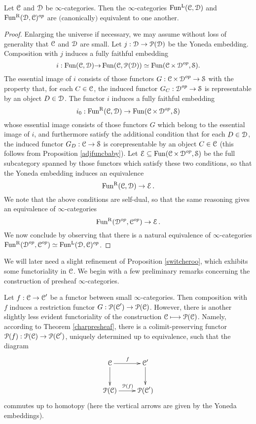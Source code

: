 \begin{proposition}\label{switcheroo}
Let $\calC$ and $\calD$ be $\infty$-categories. Then the $\infty$-categories
$\LFun(\calC, \calD)$ and $\RFun(\calD, \calC)^{op}$ are $($canonically$)$ equivalent to one another.
\end{proposition}

\begin{proof}
Enlarging the universe if necessary, we may assume without loss of generality that $\calC$ and $\calD$ are small. Let $j: \calD \rightarrow \calP(\calD)$ be the Yoneda embedding.
Composition with $j$ induces a fully faithful embedding
$$ i: \Fun(\calC,\calD) {\rightarrow} \Fun(\calC, \calP(\calD)) \simeq
\Fun( \calC \times \calD^{op}, \SSet).$$
The essential image of $i$ consists of those functors $G: \calC \times \calD^{op} \rightarrow \SSet$
with the property that, for each $C \in \calC$, the induced functor
$G_{C}: \calD^{op} \rightarrow \SSet$ is representable by an object $D \in \calD$. 
The functor $i$ induces a fully faithful embedding
$$ i_0: \RFun(\calC, \calD) \rightarrow \Fun(\calC \times \calD^{op}, \SSet)$$
whose essential image consists of those functors $G$ which belong to the essential image
of $i$, and furthermore satisfy the additional condition that for each $D \in \calD$, the induced
functor $G_{D}: \calC \rightarrow \SSet$ is corepresentable by an object $C \in \calC$ (this
follows from Proposition \ref{adjfuncbaby}). Let $\calE \subseteq \Fun(\calC \times \calD^{op}, \SSet)$
be the full subcategory spanned by those functors which satisfy these two conditions, so that
the Yoneda embedding induces an equivalence
$$ \RFun(\calC,\calD) \rightarrow \calE.$$
We note that the above conditions are self-dual, so that the same reasoning gives an equivalence of $\infty$-categories
$$ \RFun(\calD^{op}, \calC^{op}) \rightarrow \calE.$$ 
We now conclude by observing that there is a natural equivalence of $\infty$-categories
$\RFun(\calD^{op}, \calC^{op}) \simeq \LFun( \calD, \calC)^{op}$.
\end{proof}

We will later need a slight refinement of Proposition \ref{switcheroo}, which exhibits some functoriality in $\calC$. We begin with a few preliminary remarks concerning the construction of presheaf $\infty$-categories.

Let $f: \calC \rightarrow \calC'$ be a functor between small $\infty$-categories. Then composition with $f$ induces a restriction functor $G: \calP(\calC') \rightarrow \calP(\calC)$. However, there
is another slightly less evident functoriality of the construction $\calC \mapsto \calP(\calC)$. Namely, according to Theorem \ref{charpresheaf}, there is a colimit-preserving functor $\calP(f): \calP(\calC) \rightarrow \calP(\calC')$, uniquely determined up to equivalence, such that the diagram
$$ \xymatrix{ \calC \ar[d] \ar[r]^{f} & \calC' \ar[d] \\
\calP(\calC) \ar[r]^{ \calP(f) } & \calP(\calC') } $$
commutes up to homotopy (here the vertical arrows are given by the Yoneda embeddings).

